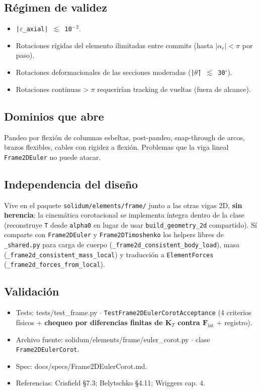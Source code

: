 \documentclass[11pt,letterpaper,oneside]{report}
\begin{document}
\subsection{Régimen de validez}
\begin{itemize}
  \item \texttt{|\ensuremath{\varepsilon}\_axial| \ensuremath{\lesssim} 10\ensuremath{^{-}}\ensuremath{^{2}}}.
  \item Rotaciones rígidas del elemento ilimitadas entre commits (hasta $|\alpha_e| < \pi$ por paso).
  \item Rotaciones deformacionales de las secciones moderadas (\texttt{|\ensuremath{\theta}̄| \ensuremath{\lesssim} 30\ensuremath{^{\circ}}}).
  \item Rotaciones continuas > \ensuremath{\pi} requerirían tracking de vueltas (fuera de alcance).
\end{itemize}

\subsection{Dominios que abre}
Pandeo por flexión de columnas esbeltas, post-pandeo, snap-through de arcos, brazos flexibles, cables con rigidez a flexión. Problemas que la viga lineal \texttt{Frame2DEuler} no puede atacar.

\subsection{Independencia del diseño}
Vive en el paquete \texttt{solidum/elements/frame/} junto a las otras vigas 2D, \textbf{sin herencia}: la cinemática corotacional se implementa íntegra dentro de la clase (reconstruye \texttt{T} desde \texttt{alpha0} en lugar de usar \texttt{build\_geometry\_2d} compartido). Sí comparte con \texttt{Frame2DEuler} y \texttt{Frame2DTimoshenko} los helpers libres de \texttt{\_shared.py} para carga de cuerpo (\texttt{\_frame2d\_consistent\_body\_load}), masa (\texttt{\_frame2d\_consistent\_mass\_local}) y traducción a \texttt{ElementForces} (\texttt{\_frame2d\_forces\_from\_local}).

\subsection{Validación}
\begin{itemize}
  \item Tests: tests/test\_frame.py \ensuremath{\cdot} \texttt{TestFrame2DEulerCorotAcceptance} (4 criterios físicos + \textbf{chequeo por diferencias finitas de $\mathbf K_T$ contra $\mathbf F_{\text{int}}$} + registro).
  \item Archivo fuente: solidum/elements/frame/euler\_corot.py \ensuremath{\cdot} clase \texttt{Frame2DEulerCorot}.
  \item Spec: docs/specs/Frame2DEulerCorot.md.
  \item Referencias: Crisfield §7.3; Belytschko §4.11; Wriggers cap. 4.
\end{itemize}
\end{document}
